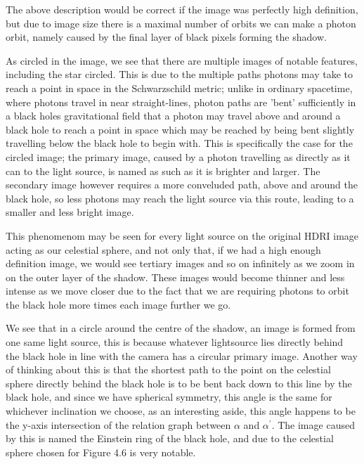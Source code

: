 \documentclass[oneside,openright,frontopenright, singlespacing]{dmathesis}
\begin{document}
\vspace{1em}
	The above description would be correct if the image was perfectly high definition, but due to image size there is a maximal number of orbits we can make a photon orbit, namely caused by the final layer of black pixels forming the shadow.

\vspace{1em}
	As circled in the image, we see that there are multiple images of notable features, including the star circled. This is due to the multiple paths photons may take to reach a point in space in the Schwarzschild metric; unlike in ordinary spacetime, where photons travel in near straight-lines, photon paths are 'bent' sufficiently in a black holes gravitational field that a photon may travel above and around a black hole to reach a point in space which may be reached by being bent slightly travelling below the black hole to begin with. This is specifically the case for the circled image; the primary image, caused by a photon travelling as directly as it can to the light source, is named as such as it is brighter and larger. The secondary image however requires a more conveluded path, above and around the black hole, so less photons may reach the light source via this route, leading to a smaller and less bright image.

\vspace{1em}
	This phenomenom may be seen for every light source on the original HDRI image acting as our celestial sphere, and not only that, if we had a high enough definition image, we would see tertiary images and so on infinitely as we zoom in on the outer layer of the shadow. These images would become thinner and less intense as we move closer due to the fact that we are requiring photons to orbit the black hole more times each image further we go.

\vspace{1em}
	We see that in a circle around the centre of the shadow, an image is formed from one same light source, this is because whatever lightsource lies directly behind the black hole in line with the camera has a circular primary image. Another way of thinking about this is that the shortest path to the point on the celestial sphere directly behind the black hole is to be bent back down to this line by the black hole, and since we have spherical symmetry, this angle is the same for whichever inclination we choose, as an interesting aside, this angle happens to be the y-axis intersection of the relation graph between $\alpha$ and $\alpha^{'}$. The image caused by this is named the Einstein ring of the black hole, and due to the celestial sphere chosen for Figure 4.6 is very notable.
\end{document}

